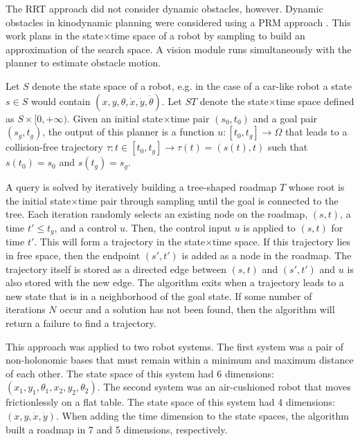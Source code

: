 The RRT approach did not consider dynamic obstacles, however. Dynamic obstacles in kinodynamic planning were considered using a PRM approach \cite{hsu2002randomized}. This work plans in the state$\times$time space of a robot by sampling to build an approximation of the search space. A vision module runs simultaneously with the planner to estimate obstacle motion.

Let $S$ denote the state space of a robot, e.g. in the case of a car-like robot a state $s \in S$ would contain $(x,y,\theta,\dot{x},\dot{y},\dot{\theta})$. 
Let $ST$ denote the state$\times$time space defined as $S\times[0,+\infty)$. Given an initial state$\times$time pair $(s_0, t_0)$ and a goal pair $(s_g, t_g)$, the output of this planner is a function $u:[t_0, t_g] \rightarrow \Omega$ that leads to a collision-free trajectory $\tau: t \in [t_0, t_g] \rightarrow \tau(t) = (s(t),t)$ such that $s(t_0)=s_0$ and $s(t_g)=s_g$.

A query is solved by iteratively building a tree-shaped roadmap $T$ whose root is the initial state$\times$time pair through sampling until the goal is connected to the tree. Each iteration randomly selects an existing node on the roadmap, $(s,t)$, a time $t' \leq t_g$, and a control $u$. Then, the control input $u$ is applied to $(s,t)$ for time $t'$. This will form a trajectory in the state$\times$time space. If this trajectory lies in free space, then the endpoint $(s',t')$ is added as a node in the roadmap. The trajectory itself is stored as a directed edge between $(s,t)$ and $(s',t')$ and $u$ is also stored with the new edge. The algorithm exits when a trajectory leads to a new state that is in a neighborhood of the goal state. If some number of iterations $N$ occur and a solution has not been found, then the algorithm will return a failure to find a trajectory.

This approach was applied to two robot systems. The first system was a pair of non-holonomic bases that must remain within a minimum and maximum distance of each other. The state space of this system had 6 dimensions: $(x_1, y_1, \theta_1, x_2, y_2, \theta_2)$. The second system was an air-cushioned robot that moves frictionlessly on a flat table. The state space of this system had 4 dimensions: $(x, y, \dot{x}, \dot{y})$. When adding the time dimension to the state spaces, the algorithm built a roadmap in 7 and 5 dimensions, respectively.

